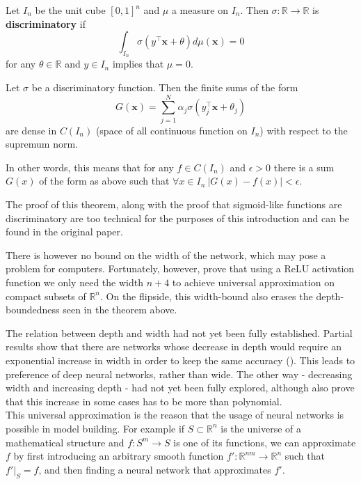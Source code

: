 \begin{defn}
 Let $I_n$ be the unit cube $[0,1]^n$ and $\mu$ a measure on $I_n$. Then $\sigma:\mathbb{R}\rightarrow\mathbb{R}$ is \textbf{discriminatory} if $$\int_{I_n}\sigma(y^\top \textbf{x}+\theta)d\mu(\textbf{x})=0$$ for any $\theta\in\mathbb{R}$ and $y\in I_n$ implies that $\mu=0$.
\end{defn}

\begin{thm}
	Let $\sigma$ be a discriminatory function. Then the finite sums of the form $$G(\textbf{x})=\sum_{j=1}^N\alpha_j\sigma(y_j^\top \textbf{x}+\theta_j)$$ are dense in $C(I_n)$ (space of all continuous function on $I_n$) with respect to the supremum norm.
	
	In other words, this means that for any $f\in C(I_n)$ and $\epsilon>0$ there is a sum $G(x)$ of the form as above such that $\forall x\in I_n\ |G(x)-f(x)|<\epsilon$.
\end{thm}

The proof of this theorem, along with the proof that sigmoid-like functions are discriminatory are too technical for the purposes of this introduction and can be found in the original paper.

There is however no bound on the width of the network, which may pose a problem for computers. Fortunately, however, \cite{narrownet} prove that using a ReLU activation function we only need the width $n+4$ to achieve universal approximation on compact subsets of $\mathbb{R}^n$. On the flipside, this width-bound also erases the depth-boundedness seen in the theorem above.

The relation between depth and width had not yet been fully established. Partial results show that there are networks whose decrease in depth would require an exponential increase in width in order to keep the same accuracy (\cite{widthexp}). This leads to preference of deep neural networks, rather than wide. The other way - decreasing width and increasing depth - had not yet been fully explored, although \cite{narrownet} also prove that this increase in some cases has to be more than polynomial.\\

This universal approximation is the reason that the usage of neural networks is possible in model building. For example if $S\subset\mathbb{R}^n$ is the universe of a mathematical structure and $f:S^m\rightarrow S$ is one of its functions, we can approximate $f$ by first introducing an arbitrary smooth function $f':\mathbb{R}^{nm}\rightarrow \mathbb{R}^n$ such that $\left.f'\right|_S=f$, and then finding a neural network that approximates $f'$.

